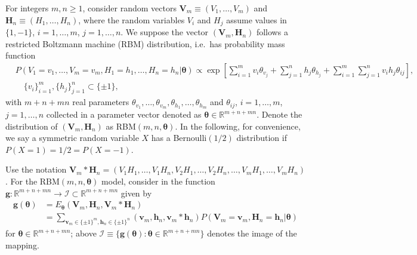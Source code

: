 \documentclass[12pt]{article}
\theoremstyle{definition}
\newcommand{\E}{E}
\begin{document}
For integers \(m,n \geq 1\), consider random vectors
\(\bm{V}_m \equiv(V_1,\ldots,V_m)\) and
\(\bm{H}_n\equiv (H_1,\ldots,H_n)\), where the random variables \(V_i\)
and \(H_j\) assume values in \(\{1,-1\}\), \(i=1,\ldots,m\),
\(j=1,\ldots,n\). We suppose the vector \((\bm{V}_m,\bm{H}_n)\) follows
a restricted Boltzmann machine (RBM) distribution, i.e.~has probability
mass function
\begin{align*}
&P(V_1= v_1,\ldots,V_m= v_m, H_1= h_1,\ldots,H_n=h_n|\bm{\theta}) \propto \exp\left[ \sum_{i=1}^m v_i \theta_{v_j} + \sum_{j=1}^n h_j \theta_{h_j} + \sum_{i=1}^m  \sum_{j=1}^n v_i  h_j \theta_{ij} \right], \\
& \quad \{v_i\}_{i=1}^m,\{h_j\}_{j=1}^n \subset\{\pm 1\},
\end{align*}
with \(m+n+mn\) real parameters
\(\theta_{v_1},\ldots,\theta_{v_m},\theta_{h_1},\ldots,\theta_{h_m}\)
and \(\theta_{ij}\), \(i=1,\ldots,m\), \(j=1,\ldots,n\) collected in a
parameter vector denoted as \(\bm{\theta}\in \mathbb{R}^{m+n+mn}\).
Denote the distribution of \((\bm{V}_m,\bm{H}_n)\) as
RBM\((m,n,\bm{\theta})\). In the following, for convenience, we say a
symmetric random variable \(X\) has a Bernoulli\((1/2)\) distribution if
\(P(X = 1) = 1/2 = P(X = -1)\).

Use the notation
\(\bm{V}_m*\bm{H}_n = (V_1 H_1,\ldots,V_1 H_n, V_2 H_1,\ldots,V_2 H_n,\ldots, V_m H_1,\ldots,V_m H_n)\).
For the RBM\((m,n,\bm{\theta})\) model, consider in the function
\(\bm{g}: \mathbb{R}^{m+n+mn} \rightarrow \mathcal{I} \subset \mathbb{R}^{m+n+mn}\)
given by
\begin{align*}
\bm{g}(\bm{\theta}) &= \E_{\bm{\theta}}(\bm{V}_m,\bm{H}_n,\bm{V}_m*\bm{H}_n)\\
&= \sum_{\bm{v}_m \in \{\pm 1\}^m, \bm{h}_n \in \{\pm 1\}^n} (\bm{v}_m,\bm{h}_n,\bm{v}_m*\bm{h}_n)P(\bm{V}_m=\bm{v}_m,\bm{H}_n=\bm{h}_n|\bm{\theta})
\end{align*}
for \(\bm{\theta}\in \mathbb{R}^{m+n+mn}\); above
\(\mathcal{I} \equiv \{\bm{g}(\bm{\theta}) : \bm{\theta}\in \mathbb{R}^{m+n+mn}\}\)
denotes the image of the mapping.
\end{document}
